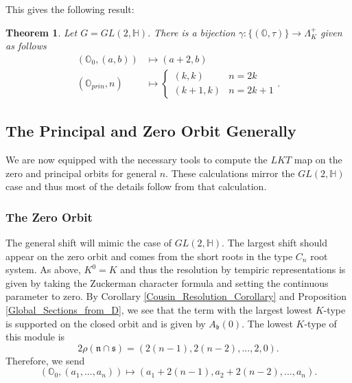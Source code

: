 \documentclass[letterpaper,twosided,11pt]{article}
\theoremstyle{plain}
\newtheorem{theorem}{Theorem}[section]
\theoremstyle{definition}
\theoremstyle{remark}
\newcommand{\HH}{\mathbb{H}}
\newcommand{\OO}{\mathbb{O}}
\newcommand{\lie}[1]{\mathfrak{#1}}
\begin{document}
This gives the following result:

\begin{theorem}
    Let $ G=GL(2,\HH). $ There is a bijection $ \gamma:\{(\OO,\tau)\}\to
    \Lambda^+_K $ given as follows
    \begin{align*}
        (\OO_0,(a,b))&\mapsto (a+2,b) \\
        (\OO_{prin},n)&\mapsto
        \begin{cases}
            (k,k) & n=2k \\
            (k+1,k) & n=2k+1
        \end{cases}.
    \end{align*}
\end{theorem}


\subsection{The Principal and Zero Orbit Generally}

We are now equipped with the necessary tools to compute the $LKT$
 map on the zero and principal orbits for general $n.$ 
These calculations mirror the $GL(2,\HH)$ case and 
thus most of the details follow from that calculation. 


\subsubsection{The Zero Orbit}

 The general shift will mimic the case of $
GL(2,\HH). $ The largest shift should appear on the zero orbit and comes
from the short roots in the type $ C_n $ root system.  As above, $ K^0=K
$ and thus the resolution by tempiric representations is given by taking
the Zuckerman character formula and setting the continuous parameter to
zero.  By Corollary \ref{Cousin_Resolution_Corollary} and Proposition
\ref{Global_Sections_from_D}, we see that the term with the largest
lowest $ K $-type is supported on the closed orbit and is given by $ A_\lie
{b}(0). $ The lowest $ K $-type of this module is
\[
    2\rho(\lie{n}\cap \lie{s})=(2(n-1),2(n-2),...,2,0).
\]
Therefore, we send
\[
    (\OO_0, (a_1,...,a_n))\mapsto (a_1+2(n-1),a_2+2(n-2),...,a_n).
\]

\end{document}
